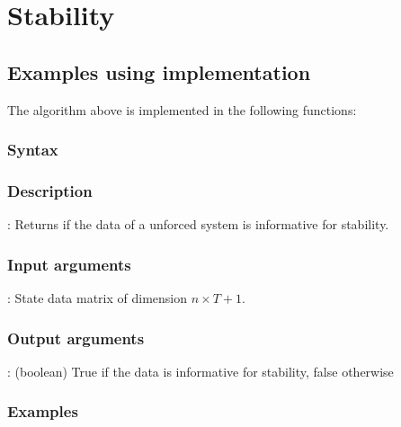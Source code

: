 \section{Stability}










\subsection{Examples using implementation}
The algorithm above is implemented in the following functions:
\subsubsection*{Syntax}

\subsubsection*{Description}
: Returns if the data of a unforced system is informative for stability.

\subsubsection*{Input arguments}
\textbf{}: State data matrix of dimension $n \times T+1$.

\subsubsection*{Output arguments}
\textbf{}: (boolean) True if the data is informative for stability, false otherwise

\subsubsection{Examples}